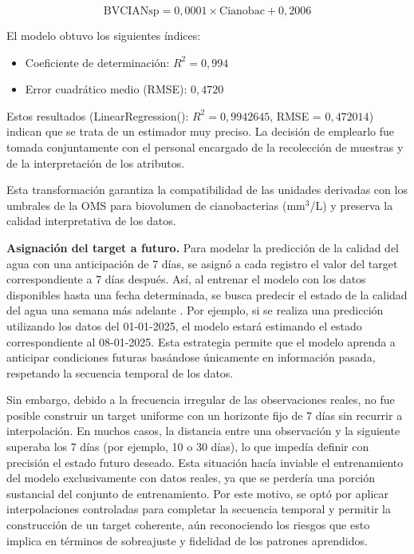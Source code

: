 \documentclass[11pt]{report}
\begin{document}
\[
\text{BVCIANsp} = 0{,}0001 \times \text{Cianobac} + 0{,}2006
\]

El modelo obtuvo los siguientes índices:

\begin{itemize}[noitemsep]
  \item Coeficiente de determinación: $R^2 = 0{,}994$
  \item Error cuadrático medio (RMSE): $0{,}4720$
\end{itemize}

Estos resultados (LinearRegression(): $R^2 = 0{,}9942645$, RMSE = $0{,}472014$) indican que se trata de un estimador muy preciso. La decisión de emplearlo fue tomada conjuntamente con el personal encargado de la recolección de muestras y de la interpretación de los atributos.

Esta transformación garantiza la compatibilidad de las unidades derivadas con los umbrales de la OMS para biovolumen de cianobacterias (mm$^{3}$/L) y preserva la calidad interpretativa de los datos.

\textbf{Asignación del target a futuro.} 
Para modelar la predicción de la calidad del agua con una anticipación de 7 días, se asignó a cada registro el valor del target correspondiente a 7 días después. Así, al entrenar el modelo con los datos disponibles hasta una fecha determinada, se busca predecir el estado de la calidad del agua una semana más adelante \citep{datacamp2022forecasting}. Por ejemplo, si se realiza una predicción utilizando los datos del 01-01-2025, el modelo estará estimando el estado correspondiente al 08-01-2025. Esta estrategia permite que el modelo aprenda a anticipar condiciones futuras basándose únicamente en información pasada, respetando la secuencia temporal de los datos.


Sin embargo, debido a la frecuencia irregular de las observaciones reales, no fue posible construir un target uniforme con un horizonte fijo de 7 días sin recurrir a interpolación. En muchos casos, la distancia entre una observación y la siguiente superaba los 7 días (por ejemplo, 10 o 30 días), lo que impedía definir con precisión el estado futuro deseado. Esta situación hacía inviable el entrenamiento del modelo exclusivamente con datos reales, ya que se perdería una porción sustancial del conjunto de entrenamiento. Por este motivo, se optó por aplicar interpolaciones controladas para completar la secuencia temporal y permitir la construcción de un target coherente, aún reconociendo los riesgos que esto implica en términos de sobreajuste y fidelidad de los patrones aprendidos.
\end{document}
